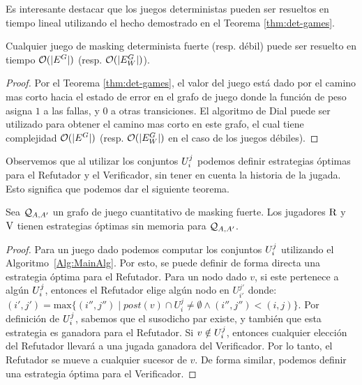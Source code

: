 	Es interesante destacar que los juegos deterministas pueden ser resueltos en tiempo lineal utilizando el hecho demostrado en el Teorema \ref{thm:det-games}.
\begin{theorem}\label{thm:deterministic-qgame-complexity} 
  Cualquier juego de masking determinista fuerte (resp. débil) puede ser resuelto en tiempo $\mathcal{O}(|E^G|)$ (resp. $\mathcal{O}(|E_W^G|)$).
\end{theorem}
\begin{proof} Por el Teorema \ref{thm:det-games}, el valor del juego está dado por el camino mas corto hacia el estado de error en el grafo de juego donde la función de peso asigna $1$ a las fallas, y $0$ a otras transiciones. El algoritmo de Dial \cite{Dial69} puede ser utilizado para obtener el camino mas corto en este grafo, el cual tiene complejidad $\mathcal{O}(|E^G|)$  (resp. $\mathcal{O}(|E^G_W|)$ en el caso de los juegos débiles).
\qedhere
\end{proof} 

Observemos que al utilizar los conjuntos $U^j_i$ podemos definir estrategias óptimas para el Refutador y el Verificador, sin tener en cuenta la historia de la jugada. Esto significa que podemos dar el siguiente teorema.
 
\begin{theorem} \label{thm:memoryless} Sea $\mathcal{Q}_{A, A'}$ un grafo de juego cuantitativo de masking fuerte.
  Los jugadores $\mathrm{R}$ y $\mathrm{V}$ tienen estrategias óptimas sin memoria para $\mathcal{Q}_{A, A'}$.
\end{theorem}
\begin{proof} Para un juego dado podemos computar los conjuntos $U^j_i$ utilizando el Algoritmo~\ref{Alg:MainAlg}.
Por esto, se puede definir de forma directa una estrategia óptima para el Refutador. 
Para un nodo dado $v$, si este pertenece a algún $U^j_i$, entonces el Refutador elige algún nodo en $U^{j'}_{i'}$ donde: 
$(i', j') = \text{max}\{(i'', j'') \mid post(v) \cap U^{j}_{i} \neq \emptyset \wedge (i'',j'') < (i,j) \}$. 
Por definición de $U^j_i$, sabemos que el susodicho par existe, y también que esta estrategia es ganadora para el Refutador. Si $v \notin U^j_i$, entonces cualquier elección del Refutador llevará a una jugada ganadora del Verificador. 
Por lo tanto, el Refutador se mueve a cualquier sucesor de $v$.
De forma similar, podemos definir una estrategia óptima para el Verificador.
\qedhere 
\end{proof} \\



